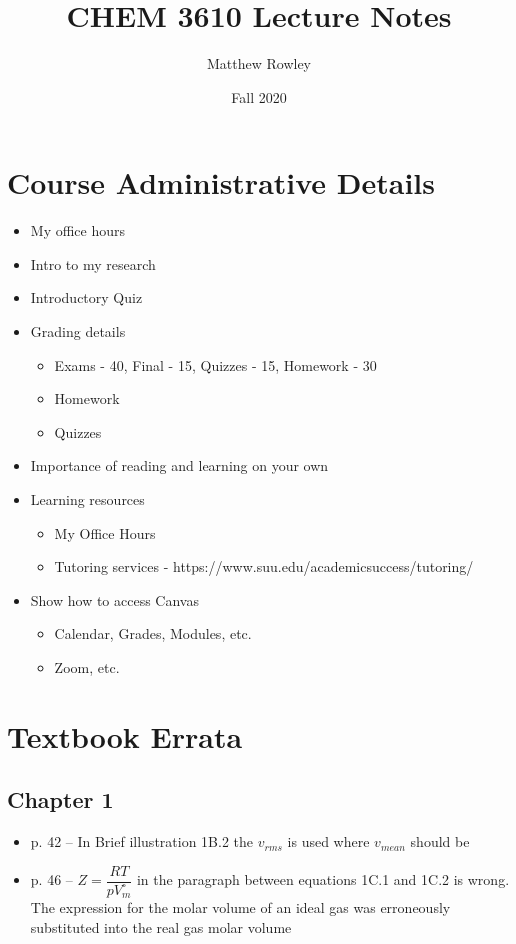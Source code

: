 \documentclass[12pt, openany, letterpaper]{memoir}
\begin{document}
\title{CHEM 3610 Lecture Notes}
\author{Matthew Rowley}
\date{Fall 2020}
\mainmatter
\maketitle

\chapter*{Course Administrative Details}
\begin{itemize}
	\item My office hours
	\item Intro to my research
	\item Introductory Quiz
	\item Grading details
	\begin{itemize}
		\item Exams - 40, Final - 15, Quizzes - 15, Homework - 30
		\item Homework
		\item Quizzes
	\end{itemize}
	\item Importance of reading and learning on your own
	\item Learning resources
	\begin{itemize}
		\item My Office Hours
		\item Tutoring services - https://www.suu.edu/academicsuccess/tutoring/
	\end{itemize}
	\item Show how to access Canvas
	\begin{itemize}
		\item Calendar, Grades, Modules, etc.
		\item Zoom, etc.
	\end{itemize}	
\end{itemize}

\chapter*{Textbook Errata}
\section*{Chapter 1}
\begin{itemize}
	\item p. 42 -- In Brief illustration 1B.2 the $v_{rms}$ is used where $v_{mean}$ should be
	\item p. 46 -- $Z = \dfrac{RT}{pV_m^\circ}$ in the paragraph between equations 1C.1 and 1C.2 is wrong. The expression for the molar volume of an ideal gas was erroneously substituted into the real gas molar volume
\end{itemize}
\end{document}
